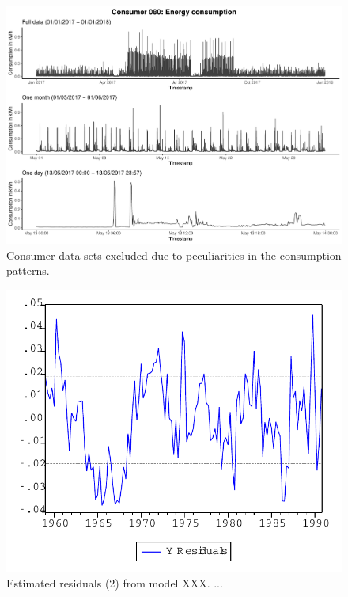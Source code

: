 \begin{centering}
\begin{figure}[!htbp]
        \includegraphics[width=\textwidth-0.85cm]{thesis/graphs/timeseries/c080_cons.pdf}
        \caption[Consumer data sets excluded due to peculiarities in the consumption patterns]{Consumer data sets excluded due to peculiarities in the consumption patterns. \quantnet}
        \label{App:Fig:excludedcons}
\end{figure}
\end{centering}



\begin{figure}[ht]
    \begin{center}
        \includegraphics[scale=0.5,angle=0]{thesis/figures/graph.pdf}
        \caption{Estimated residuals (2) from model XXX. ...}
        \label{Fig:Resids2}
    \end{center}
\end{figure}
